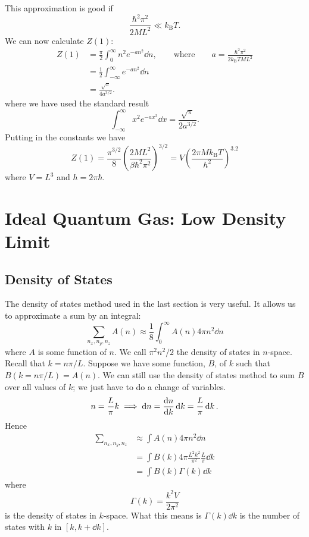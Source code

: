 \documentclass[a4paper]{article}
\newcommand{\boltzmann}{k_\mathrm{B}}
\begin{document}
    This approximation is good if
    \[\frac{\hbar^2\pi^2}{2ML^2} \ll \boltzmann T.\]
    We can now calculate \(Z(1)\):
    \begin{align*}
        Z(1) &= \frac{\pi}{2} \int_{0}^{\infty} n^2 e^{-an^2} \dd{n}, \qquad\text{where}\qquad a = \frac{\hbar^2 \pi^2}{2\boltzmann TML^2}\\
        &= \frac{1}{2}\int_{-\infty}^{\infty} e^{-an^2} \dd{n}\\
        &= \frac{\sqrt{\pi}}{4a^{3/2}}.
    \end{align*}
    where we have used the standard result
    \[\int_{-\infty}^{\infty} x^2e^{-ax^2} \dd{x} = \frac{\sqrt{\pi}}{2a^{3/2}}.\]
    Putting in the constants we have
    \[Z(1) = \frac{\pi^{3/2}}{8}\left( \frac{2ML^2}{\beta\hbar^2\pi^2} \right)^{3/2} = V \left( \frac{2\pi M\boltzmann T}{h^2} \right)^{3.2}\]
    where \(V = L^3\) and \(h = 2\pi\hbar\).
    
    \section{Ideal Quantum Gas: Low Density Limit}
    \subsection{Density of States}\label{sec:density of states}
    The density of states method used in the last section is very useful.
    It allows us to approximate a sum by an integral:
    \[\sum_{n_x, n_y, n_z} A(n) \approx \frac{1}{8} \int_{0}^{\infty} A(n) 4\pi n^2 \dd{n}\]
    where \(A\) is some function of \(n\).
    We call \(\pi^2n^2/2\) the density of states in \(n\)-space.
    Recall that \(k = n\pi/L\).
    Suppose we have some function, \(B\), of \(k\) such that \(B(k = n\pi/L) = A(n)\).
    We can still use the density of states method to sum \(B\) over all values of \(k\); we just have to do a change of variables.
    \[n = \frac{L}{\pi}k \implies \dd{n} = \dv{n}{k}\dd{k} = \frac{L}{\pi}\dd{k}.\]
    Hence
    \begin{align*}
        \sum_{n_x, n_y, n_z} &\approx \int A(n) 4\pi n^2 \dd{n}\\
        &= \int B(k)4\pi \frac{L^2k^2}{\pi^2}\frac{L}{\pi}\dd{k}\\
        &= \int B(k)\Gamma(k)\dd{k}
    \end{align*}
    where
    \[\Gamma(k) = \frac{k^2V}{2\pi^2}\]
    is the density of states in \(k\)-space.
    What this means is \(\Gamma(k)\dd{k}\) is the number of states with \(k\) in \([k, k+\dd{k}]\).
    
\end{document}
